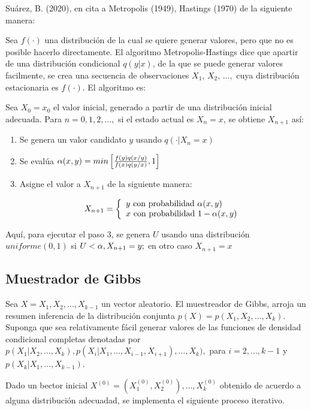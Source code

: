 Suárez, B. (2020), en \cite{tesisbiviana} cita a Metropolis (1949), Hastings (1970) de la siguiente manera: 

Sea $f(\cdot)$ una distribución de la cual se quiere generar valores, pero que no es posible hacerlo directamente. El algoritmo Metropolis-Hastings dice que apartir de una distribución condicional $q(y|x)$, de la que se puede generar valores facilmente, se crea una secuencia de observaciones $X_1$, $X_2$, $\dots,$ cuya distribución estacionaria es $f(\cdot)$. El algoritmo es: 

Sea $X_0=x_0$ el valor inicial, generado a partir de una distribución inicial adecuada. Para $n=0,1,2,\dots,$ si el estado actual es $X_n=x$, se obtiene $X_{n+1}$ así: 

\begin{enumerate}
\item Se genera un valor candidato $y$ usando $q(\cdot | X_n=x)$
\item Se evalúa $\alpha(x,y)=min \left[ \frac{f(y)q(x/y)}{f(x)q(y/x)},1\right]$

\item Asigne el valor a $X_{n+1}$ de la siguiente manera: 

\begin{displaymath}
X_{n+1} = \left\{ \begin{array}{l}
y \text{ con probabilidad } \alpha(x,y) \\
x \text{ con probabilidad } 1-\alpha(x,y) 
\end{array}
\right.
\end{displaymath}
\end{enumerate}

Aquí, para ejecutar el paso 3, se genera $U$ usando una distribución $uniforme(0,1)$ si $U<\alpha, X_{n+1}=y;$ en otro caso $X_{n+1}=x$


\subsection{Muestrador de Gibbs}

Sea $X=X_1, X_2, \dots ,X_{k-1}$ un vector aleatorio. El muestreador de Gibbs, arroja un resumen inferencia de la distribución conjunta $p(X)=p(X_1,X_2,\dots,X_k)$. Suponga que sea relativamente fácil generar valores de las funciones de densidad condicional completas denotadas por $p(X_1|X_2, \dots , X_k), p(X_i|X_1,\dots,X_{i-1},X_{i+1}), \dots ,X_k),$ para $i=2,\dots,k-1$ y $p(X_k|X_1,\dots,X_{k-1})$.

Dado un bector inicial $X^{(0)}=(X_1^{(0)},X_2^{(0)}),\dots,X_k^{(0)}$ obtenido de acuerdo a alguna distribución adecuadad, se implementa el siguiente proceso iterativo. 

